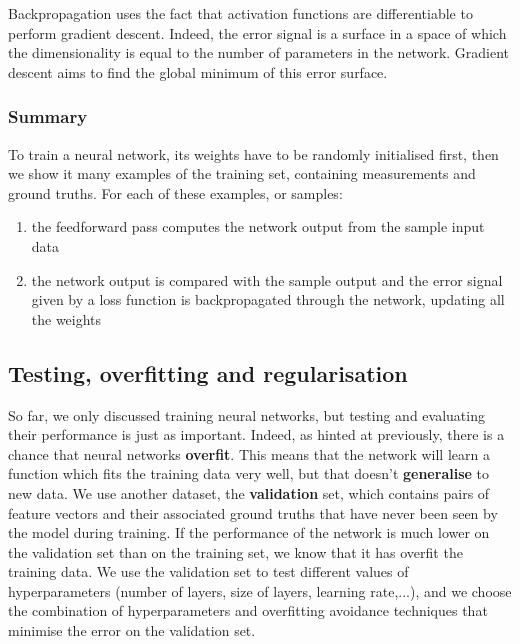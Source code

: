 Backpropagation uses the fact that activation functions are differentiable to
perform gradient descent. Indeed, the error signal is a surface in a space
of which the dimensionality is equal to the number of parameters in the
network. Gradient descent aims to find the global minimum of this error
surface.\\


\subsubsection{Summary}
To train a neural network, its weights have to be randomly initialised first,
then we show it many examples of the training set, containing measurements and
ground truths. For each of these examples, or samples:
\begin{enumerate}
	\item the feedforward pass computes the network output from the sample
		input data
	\item the network output is compared with the sample output and the
		error signal given by a loss function
		is backpropagated through the network, updating
		all the weights
\end{enumerate}

\subsection{Testing, overfitting and regularisation}
\label{sec:regularisation}
So far, we only discussed training neural networks, but testing and
evaluating their performance is just as important. Indeed, as hinted at
previously, there is a chance that neural networks \textbf{overfit}. This
means that the network will learn a function which fits the training data
very well, but that doesn't \textbf{generalise} to new data. We use
another dataset, the \textbf{validation} set, which contains pairs of feature
vectors and their associated ground truths that have never been seen by the
model during training. If the performance of the network is much lower on
the validation set than on the training set, we know that it has overfit
the training data. We use the validation set to test different 
values of hyperparameters (number of layers, size of layers, learning rate,...),
and we choose the combination of hyperparameters and overfitting avoidance
techniques that minimise the error on the validation set.\\


